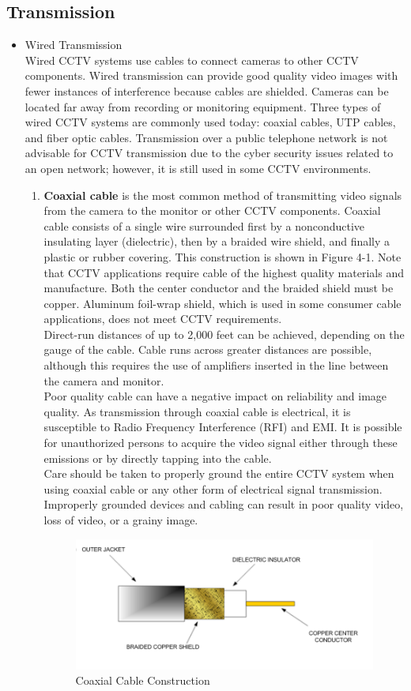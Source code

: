 \documentclass[12pt,fleqn]{book} %
\begin{document}
\subsection{Transmission }
\begin{itemize}
    \item Wired Transmission 
    \\Wired CCTV systems use cables to connect cameras to other CCTV components. Wired transmission can provide good quality video images with fewer instances of interference because cables are shielded. Cameras can be located far away from recording or monitoring equipment. Three types of wired CCTV systems are commonly used today: coaxial cables, UTP cables, and fiber optic cables. Transmission over a public telephone network is not advisable for CCTV transmission due to the cyber security issues related to an open network; however, it is still used in some CCTV environments.
    \begin{enumerate}
        \item \textbf{Coaxial cable} is the most common method of transmitting video signals from the camera to the monitor or other CCTV components. Coaxial cable consists of a single wire surrounded first by a nonconductive insulating layer (dielectric), then by a braided wire shield, and finally a plastic or rubber covering. This construction is shown in Figure 4-1. Note that CCTV applications require cable of the highest quality materials and manufacture. Both the center conductor and the braided shield must be copper. Aluminum foil-wrap shield, which is used in some consumer cable applications, does not meet CCTV requirements.
        \\Direct-run distances of up to 2,000 feet can be achieved, depending on the gauge of the cable. Cable runs across greater distances are possible, although this requires the use of amplifiers inserted in the line between the camera and monitor. 
        \\Poor quality cable can have a negative impact on reliability and image quality. As transmission through coaxial cable is electrical, it is susceptible to Radio Frequency Interference (RFI) and EMI. It is possible for unauthorized persons to acquire the video signal either through these emissions or by directly tapping into the cable. 
        \\Care should be taken to properly ground the entire CCTV system when using coaxial cable or any other form of electrical signal transmission. Improperly grounded devices and cabling can result in poor quality video, loss of video, or a grainy image.
                          \begin{figure}[!h]
    \centering
    \includegraphics[width=0.5\linewidth]{c 16.png}
    \caption{Coaxial Cable Construction}
    \label{fig:c 16}
    \end{figure}
        

\end{enumerate}
\end{itemize}
\end{document}
